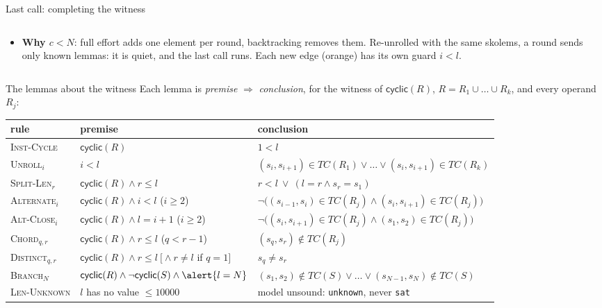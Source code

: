 \documentclass[aspectratio=169]{beamer}
\newcommand{\sm}[1]{\texttt{#1}}
\newcommand{\TC}{\mathit{TC}}
\newcommand{\cyc}[1]{\mathsf{cyclic}(#1)}
\newcommand{\rn}[1]{\textsc{#1}}
\begin{document}
\begin{frame}{Last call: completing the witness}
\begin{columns}[T]
\begin{column}{0.46\textwidth}
    \footnotesize
    \begin{itemize}
      \item \textbf{Why $c < N$}: full effort adds one element per round, backtracking removes
        them. Re-unrolled with the same skolems, a round sends only known lemmas: it is quiet,
        and the last call runs. Each new edge (orange) has its own guard $i < l$.
    \end{itemize}
  \end{column}
  \end{columns}
\end{frame}

\begin{frame}{The lemmas about the witness}
  \footnotesize\vspace{-1mm}
  Each lemma is \emph{premise} $\Rightarrow$ \emph{conclusion}, for the witness of
  $\cyc{R}$, $R = R_1\cup\dots\cup R_k$, and every operand $R_j$:
  \begin{center}
  \scriptsize\renewcommand{\arraystretch}{1.05}
  \begin{tabular}{@{}L{2.4cm}L{4.6cm}L{7.2cm}@{}}
    \toprule
    rule & premise & conclusion \\
    \midrule
    \rn{Inst-Cycle} & $\cyc{R}$ & $1 < l$ \\
    \rn{Unroll}$_i$ & $i < l$ & $(s_i,s_{i+1})\in\TC(R_1)\vee\dots\vee(s_i,s_{i+1})\in\TC(R_k)$ \\
    \rn{Split-Len}$_r$ & $\cyc{R}\wedge r \le l$ & $r < l\ \vee\ (l = r \wedge s_r = s_1)$ \\
    \rn{Alternate}$_i$ & $\cyc{R}\wedge i < l$ \hfill ($i\ge 2$) &
      $\neg\big((s_{i-1},s_i)\in\TC(R_j)\wedge(s_i,s_{i+1})\in\TC(R_j)\big)$ \\
    \rn{Alt-Close}$_i$ & $\cyc{R}\wedge l = i+1$ \hfill ($i\ge 2$) &
      $\neg\big((s_i,s_{i+1})\in\TC(R_j)\wedge(s_1,s_2)\in\TC(R_j)\big)$ \\
    \rn{Chord}$_{q,r}$ & $\cyc{R}\wedge r\le l$ \hfill ($q < r-1$) & $(s_q,s_r)\notin\TC(R_j)$ \\
    \rn{Distinct}$_{q,r}$ & $\cyc{R}\wedge r\le l\ [{}\wedge r\ne l$ if $q=1]$ & $s_q\ne s_r$ \\
    \rn{Branch}$_N$ & $\cyc{R}\wedge\neg\cyc{S}\wedge \alert{l = N}$ &
      $(s_1,s_2)\notin\TC(S)\vee\dots\vee(s_{N-1},s_N)\notin\TC(S)$ \\
    \rn{Len-Unknown} & $l$ has no value $\le 10000$ & model unsound: \sm{unknown}, never \sm{sat} \\
    \bottomrule
  \end{tabular}

\end{center}
\end{frame}
\end{document}
